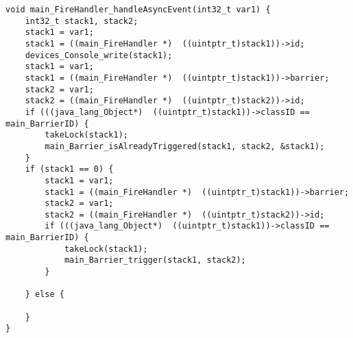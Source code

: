 \begin{landscape}
\begin{multicols}{2}
\begin{lstlisting}[firstnumber=2759]
void main_FireHandler_handleAsyncEvent(int32_t var1) {
	int32_t stack1, stack2;
	stack1 = var1;
	stack1 = ((main_FireHandler *)  ((uintptr_t)stack1))->id;
	devices_Console_write(stack1);
	stack1 = var1;
	stack1 = ((main_FireHandler *)  ((uintptr_t)stack1))->barrier;
	stack2 = var1;
	stack2 = ((main_FireHandler *)  ((uintptr_t)stack2))->id;
	if (((java_lang_Object*)  ((uintptr_t)stack1))->classID == main_BarrierID) {
		takeLock(stack1);
		main_Barrier_isAlreadyTriggered(stack1, stack2, &stack1);
	}
	if (stack1 == 0) {
		stack1 = var1;
		stack1 = ((main_FireHandler *)  ((uintptr_t)stack1))->barrier;
		stack2 = var1;
		stack2 = ((main_FireHandler *)  ((uintptr_t)stack2))->id;
		if (((java_lang_Object*)  ((uintptr_t)stack1))->classID == main_BarrierID) {
			takeLock(stack1);
			main_Barrier_trigger(stack1, stack2);
		}

	} else {
		
	}
}
\end{lstlisting}

\end{multicols}
\end{landscape}